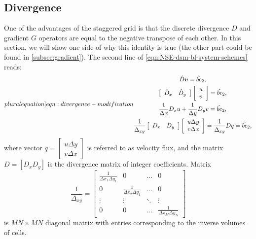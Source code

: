 \documentclass{article}
\numberwithin{equation}{section}
\begin{document}
\subsection{Divergence}\label{subsec:divergence}

One of the advantages of the staggered grid is that the discrete divergence $D$ and gradient $G$ operators are equal to the negative transpose of each other. 
In this section, we will show one side of why this identity is true (the other part could be found in \cref{subsec:gradient}).
The second line of \cref{eqn:NSE-dsm-bl-system-schemes} reads:
\begin{equation}\label[pluralequation]{eqn:divergence-modification}
\begin{gathered}
\hat{D}\boldsymbol{v}=\hat{bc}_2,\\
\left[ 
\begin{array}{ll}
\hat{D}_x & \hat{D}_y 	
\end{array}
\right]\left[\begin{array}{l}
u\\
v
\end{array}
\right]=\hat{bc}_2
, \\
\frac{1}{\Delta x} D_x u+\frac{1}{\Delta y} D_y v=\hat{bc}_2, \\
\frac{1}{\Delta _{xy}}\left[\begin{array}{ll}
D_x & D_y
\end{array}\right]\left[\begin{array}{l}
u \Delta y \\
v \Delta x
\end{array}\right]=\frac{1}{\Delta _{xy}} D q=\hat{bc}_2,
\end{gathered}
\end{equation}
where vector $q=\left[\begin{array}{l}
u \Delta y \\
v \Delta x
\end{array}\right]$ is referred to as velocity flux, and the matrix $D=[D_x D_y]$ is the divergence matrix of integer coefficients. Matrix
\begin{equation}\label{eqn:delta-xy}
	\frac{1}{\Delta _{xy}}=
	\begin{bmatrix}{}
		\frac{1}{\Delta x_1\Delta y_1}		&0	&\dots	&0\\
		0		&\frac{1}{\Delta x_2\Delta y_1}	&\dots	&0\\
		\vdots		&\vdots	&\ddots	&\vdots\\
		0		&0	&\dots	&\frac{1}{\Delta x_M\Delta y_N}
	\end{bmatrix}
\end{equation}
is $MN\times MN$ diagonal matrix with entries corresponding to the inverse volumes of cells. 
\end{document}
